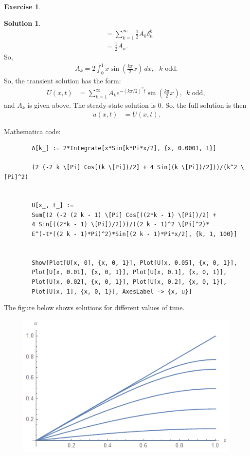 \documentclass{article}
\theoremstyle{definition}
\newtheorem*{exer*}{Exercise}
\newtheorem*{sln*}{Solution}
\begin{document}
\begin{exer*}
\begin{sln*}
\begin{align*}
		&= \sum_{k=1}^\infty \frac{1}{2}A_k\delta^k_n\\
		&= \frac{1}{2}A_n.
		\end{align*}
		So,
		\begin{align*}
		A_k = 2\int_{0}^1x\sin\left(\frac{k\pi}{2} x\right)\,dx,\,\,\,\, k \text{ odd}.
		\end{align*}
		So, the transient solution has the form:
		\begin{align*}
		U(x,t) &= \sum_{k=1}^\infty A_k e^{-(k\pi/2)^2t} \sin\left(\frac{k\pi}{2} x\right),\,\,\, k \text{ odd},
		\end{align*}
		and $A_k$ is given above. The steady-state solution is 0. So, the full solution is then
		\begin{align*}
		u(x,t) &= U(x,t).
		\end{align*}
		
		\noindent Mathematica code:
		\begin{lstlisting}
		A[k_] := 2*Integrate[x*Sin[k*Pi*x/2], {x, 0.0001, 1}]
		
		(2 (-2 k \[Pi] Cos[(k \[Pi])/2] + 4 Sin[(k \[Pi])/2]))/(k^2 \[Pi]^2)
		
		
		U[x_, t_] := 
		Sum[(2 (-2 (2 k - 1) \[Pi] Cos[((2*k - 1) \[Pi])/2] + 
		4 Sin[((2*k - 1) \[Pi])/2]))/((2 k - 1)^2 \[Pi]^2)*
		E^(-t*((2 k - 1)*Pi)^2)*Sin[(2 k - 1)*Pi*x/2], {k, 1, 100}]
		
		
		Show[Plot[U[x, 0], {x, 0, 1}], Plot[U[x, 0.05], {x, 0, 1}], 
		Plot[U[x, 0.01], {x, 0, 1}], Plot[U[x, 0.1], {x, 0, 1}], 
		Plot[U[x, 0.02], {x, 0, 1}], Plot[U[x, 0.2], {x, 0, 1}], 
		Plot[U[x, 1], {x, 0, 1}], AxesLabel -> {x, u}]
		\end{lstlisting}
		
		\newpage
		\noindent The figure below shows solutions for different values of time.\\
		
		\begin{figure}[h!]
			\centering
			\includegraphics[scale=0.7]{pset2_2.png}
		\end{figure}
		

\end{sln*}
\end{exer*}
\end{document}
